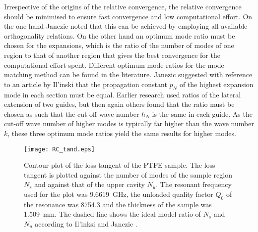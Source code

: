 Irrespective of the origins of the relative convergence, the relative convergence should be minimised to ensure fast convergence and low computational effort. On the one hand Janezic \cite{janezic} noted that this can be achieved by employing all available orthogonality relations. On the other hand an optimum mode ratio must be chosen for the expansions, which is the ratio of the number of modes of one region to that of another region that gives the best convergence for the computational effort spent. Different optimum mode ratios for the mode-matching method can be found in the literature. Janezic suggested with reference to an article by Il'inski \cite{ilinski} that the propagation constant $p_N$ of the highest expansion mode in each section must be equal. Earlier research used ratios of the lateral extension of two guides, but then again others found that the ratio must be chosen as such that the cut-off wave number $h_N$  is the same in each guide. As the cut-off wave number of higher modes is typically far higher than the wave number $k$, these three optimum mode ratios yield the same results for higher modes. 

\begin{figure}
\centering
\texttt{[image: RC\_tand.eps]}
\caption{Contour plot of the loss tangent of the PTFE sample. The loss tangent is plotted against the number of modes of the sample region $N_s$ and against that of the upper cavity $N_u$. The resonant frequency used for the plot was \SI{9.6619}{\giga\hertz}, the unloaded quality factor $Q_0$ of the resonance was \num{8754.3} and the thickness of the sample was \SI{1.509}{\milli\meter}. The dashed line shows the ideal model ratio of $N_s$ and $N_u$ according to Il'inksi \cite{ilinski} and Janezic \cite{janezic}.}\label{fig:RCtand}
\end{figure}

